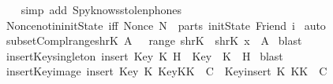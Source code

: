 \begin{isabellebody}
  \ \ \isamarkupfalse%
  \ {\isacharparenleft}simp\ add{\isacharcolon}\ Spy{\isacharunderscore}knows{\isacharunderscore}stolen{\isacharunderscore}phones{\isacharparenright}\isanewline
  \isamarkupfalse%
  \endisatagproof
  {\isafoldproof}%
  \isadelimproof
  \endisadelimproof
  \isadelimdocument
  \endisadelimdocument
  \isatagdocument
  \isamarkuptrue%
  \endisatagdocument
  {\isafolddocument}%
  \isadelimdocument
  \endisadelimdocument
  \isamarkupfalse%
  \ Nonce{\isacharunderscore}notin{\isacharunderscore}initState\ {\isacharbrackleft}iff{\isacharbrackright}{\isacharcolon}\ {\isachardoublequoteopen}Nonce\ N\ {\isasymnotin}\ parts\ {\isacharparenleft}initState\ {\isacharparenleft}Friend\ i{\isacharparenright}{\isacharparenright}{\isachardoublequoteclose}\isanewline
  \isadelimproof
  \endisadelimproof
  \isatagproof
  \isamarkupfalse%
  \ auto%
  \endisatagproof
  {\isafoldproof}%
  \isadelimproof
  \isanewline
  \endisadelimproof
  \isanewline
  \isamarkupfalse%
  \ subset{\isacharunderscore}Compl{\isacharunderscore}range{\isacharunderscore}shrK{\isacharcolon}\ {\isachardoublequoteopen}A\ {\isasymsubseteq}\ {\isacharminus}\ {\isacharparenleft}range\ shrK{\isacharparenright}\ {\isasymLongrightarrow}\ shrK\ x\ {\isasymnotin}\ A{\isachardoublequoteclose}\isanewline
  \isadelimproof
  \endisadelimproof
  \isatagproof
  \isamarkupfalse%
  \ blast%
  \endisatagproof
  {\isafoldproof}%
  \isadelimproof
  \isanewline
  \endisadelimproof
  \isanewline
  \isamarkupfalse%
  \ insert{\isacharunderscore}Key{\isacharunderscore}singleton{\isacharcolon}\ {\isachardoublequoteopen}insert\ {\isacharparenleft}Key\ K{\isacharparenright}\ H\ {\isacharequal}\ Key\ {\isacharbackquote}\ {\isacharbraceleft}K{\isacharbraceright}\ {\isasymunion}\ H{\isachardoublequoteclose}\isanewline
  \isadelimproof
  \endisadelimproof
  \isatagproof
  \isamarkupfalse%
  \ blast%
  \endisatagproof
  {\isafoldproof}%
  \isadelimproof
  \isanewline
  \endisadelimproof
  \isanewline
  \isamarkupfalse%
  \ insert{\isacharunderscore}Key{\isacharunderscore}image{\isacharcolon}\ {\isachardoublequoteopen}insert\ {\isacharparenleft}Key\ K{\isacharparenright}\ {\isacharparenleft}Key{\isacharbackquote}KK\ {\isasymunion}\ C{\isacharparenright}\ {\isacharequal}\ Key{\isacharbackquote}{\isacharparenleft}insert\ K\ KK{\isacharparenright}\ {\isasymunion}\ C{\isachardoublequoteclose}\isanewline

\end{isabellebody}
